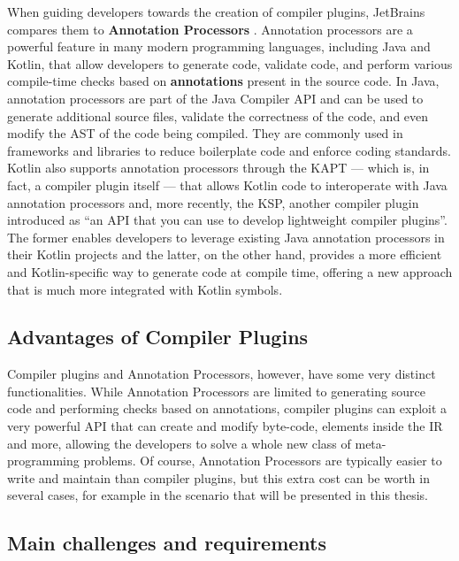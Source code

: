 \documentclass[12pt,a4paper,openright,twoside]{book}
\begin{document}
When guiding developers towards the creation of compiler plugins, JetBrains
compares them to \textbf{Annotation Processors}
\cite{JetBrains:KotlinCompilerPlugin}. Annotation processors are a powerful
feature in many modern programming languages, including Java and Kotlin, that
allow developers to generate code, validate code, and perform various
compile-time checks based on \textbf{annotations} present in the source code.
%
In Java, annotation processors are part of the Java Compiler API and can be used
to generate additional source files, validate the correctness of the code, and
even modify the \ac{AST} of the code being compiled. They are
commonly used in frameworks and libraries to reduce boilerplate code and enforce
coding standards.
%
Kotlin also supports annotation processors through the \ac{KAPT} — which is, in
fact, a compiler plugin itself — that allows Kotlin code to interoperate with
Java annotation processors and, more recently, the \ac{KSP}, another compiler
plugin introduced as ``an API that you can use to develop lightweight compiler
plugins''. The former enables developers to leverage existing Java annotation
processors in their Kotlin projects and the latter, on the other hand, provides
a more efficient and Kotlin-specific way to generate code at compile time,
offering a new approach that is much more integrated with Kotlin symbols.

\subsection{Advantages of Compiler Plugins}

Compiler plugins and Annotation Processors, however, have some very distinct
functionalities. While Annotation Processors are limited to generating source
code and performing checks based on annotations, compiler plugins can exploit a
very powerful API that can create and modify byte-code, elements inside the
\ac{IR} and more, allowing the developers to solve a whole new class of
meta-programming problems. Of course, Annotation Processors are typically easier
to write and maintain than compiler plugins, but this extra cost can be worth in
several cases, for example in the scenario that will be presented in this
thesis.

\subsection{Main challenges and requirements}
\end{document}
